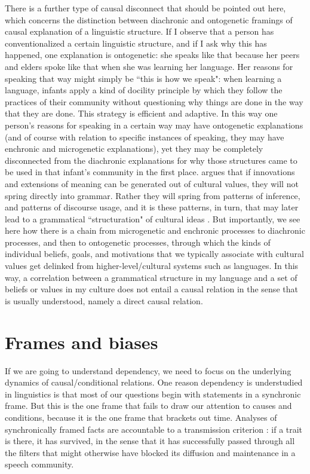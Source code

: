 \documentclass[output=paper]{langsci/langscibook}
\begin{document}
   There is a further type of causal disconnect that should be pointed out here, which concerns the distinction between diachronic and ontogenetic framings of causal explanation of a linguistic structure. If I observe that a person has conventionalized a certain linguistic structure, and if I ask why this has happened, one explanation is ontogenetic: she speaks like that because her peers and elders spoke like that when she was learning her language. Her reasons for speaking that way might simply be ``this is how we speak": when learning a language, infants apply a kind of docility principle  \citep{Simon1990} by which they follow the practices of their community without questioning why things are done in the way that they are done. This strategy is efficient and adaptive. In this way one person’s reasons for speaking in a certain way may have ontogenetic explanations (and of course with relation to specific instances of speaking, they may have enchronic and microgenetic explanations), yet they may be completely disconnected from the diachronic explanations for why those structures came to be used in that infant’s community in the first place. \citet{Simpson2002} argues that if innovations and extensions of meaning can be generated out of cultural values, they will not spring directly into grammar.   Rather they will spring from patterns of inference, and patterns of discourse usage, and it is these patterns, in turn, that may later lead to a grammatical ``structuration" of cultural ideas \citep[see also][]{Evans2003,Blythe2013}. But importantly, we see here how there is a chain from microgenetic and enchronic processes to diachronic processes, and then to ontogenetic processes, through which the kinds of individual beliefs, goals, and motivations that we typically associate with cultural values get delinked from higher-level/cultural systems such as languages. In this way, a correlation between a grammatical structure in my language and a set of beliefs or values in my culture does not entail a causal relation in the sense that is usually understood, namely a direct causal relation.

\section{Frames and biases}

 If we are going to understand dependency, we need to focus on the underlying dynamics of causal/conditional relations. One reason dependency is understudied in linguistics is that most of our questions begin with statements in a synchronic frame. But this is the one frame that fails to draw our attention to causes and conditions, because it is the one frame that brackets out time. Analyses of synchronically framed facts are accountable to a transmission criterion \citep{Enfield2014,Enfield2015}: if a trait is there, it has survived, in the sense that it has successfully passed through all the filters that might otherwise have blocked its diffusion and maintenance in a speech community. 
\end{document}
